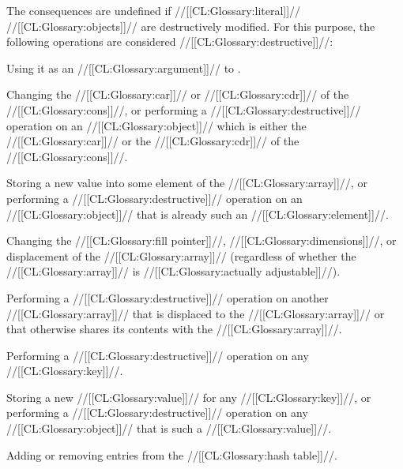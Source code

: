 

 

The consequences are undefined if //[[CL:Glossary:literal]]// //[[CL:Glossary:objects]]//  are destructively modified.  For this purpose, the following operations  are considered //[[CL:Glossary:destructive]]//:

\beginlist


Using it as an //[[CL:Glossary:argument]]// to .


Changing the //[[CL:Glossary:car]]// or //[[CL:Glossary:cdr]]// of the //[[CL:Glossary:cons]]//, or performing a //[[CL:Glossary:destructive]]// operation on an //[[CL:Glossary:object]]// which is either the //[[CL:Glossary:car]]// or the //[[CL:Glossary:cdr]]// of the //[[CL:Glossary:cons]]//.


Storing a new value into some element of the //[[CL:Glossary:array]]//, or performing a //[[CL:Glossary:destructive]]// operation  on an //[[CL:Glossary:object]]// that is already such an //[[CL:Glossary:element]]//.

Changing the //[[CL:Glossary:fill pointer]]//, //[[CL:Glossary:dimensions]]//, or displacement of the //[[CL:Glossary:array]]// (regardless of whether the //[[CL:Glossary:array]]// is //[[CL:Glossary:actually adjustable]]//).

Performing a //[[CL:Glossary:destructive]]// operation on another //[[CL:Glossary:array]]//  that is displaced to the //[[CL:Glossary:array]]// or that otherwise shares its contents with the //[[CL:Glossary:array]]//.


Performing a //[[CL:Glossary:destructive]]// operation on any //[[CL:Glossary:key]]//.

Storing a new //[[CL:Glossary:value]]// for any //[[CL:Glossary:key]]//, or performing a //[[CL:Glossary:destructive]]// operation  on any //[[CL:Glossary:object]]// that is such a //[[CL:Glossary:value]]//.

Adding or removing entries from the //[[CL:Glossary:hash table]]//.



